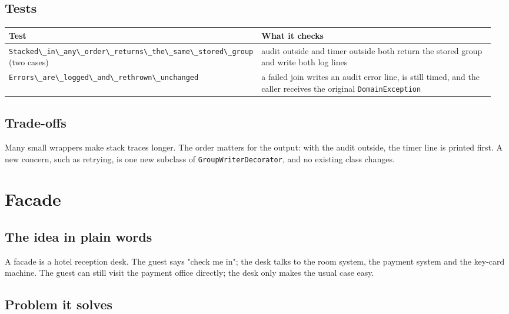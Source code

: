\documentclass{utmreport}
\providecommand{\passthrough}[1]{#1}
\newcounter{none}
\begin{document}
\section{Tests}

{\def\LTcaptype{none} %
\begin{longtable}[]{@{}>{\raggedright\arraybackslash}p{0.480\linewidth}>{\raggedright\arraybackslash}p{0.480\linewidth}@{}}
\toprule\noalign{}
Test & What it checks \\
\midrule\noalign{}
\endhead
\bottomrule\noalign{}
\endlastfoot
\passthrough{\lstinline!Stacked\_in\_any\_order\_returns\_the\_same\_stored\_group!} (two cases) & audit outside and timer outside both return the stored group and write both log lines \\
\passthrough{\lstinline!Errors\_are\_logged\_and\_rethrown\_unchanged!} & a failed join writes an audit error line, is still timed, and the caller receives the original \passthrough{\lstinline!DomainException!} \\
\end{longtable}
}

\section{Trade-offs}

Many small wrappers make stack traces longer. The order matters for the output: with the audit outside, the timer line is printed first. A new concern, such as retrying, is one new subclass of \passthrough{\lstinline!GroupWriterDecorator!}, and no existing class changes.

\chapter{Facade}

\section{The idea in plain words}

A facade is a hotel reception desk. The guest says "check me in"; the desk talks to the room system, the payment system and the key-card machine. The guest can still visit the payment office directly; the desk only makes the usual case easy.

\section{Problem it solves}
\end{document}
